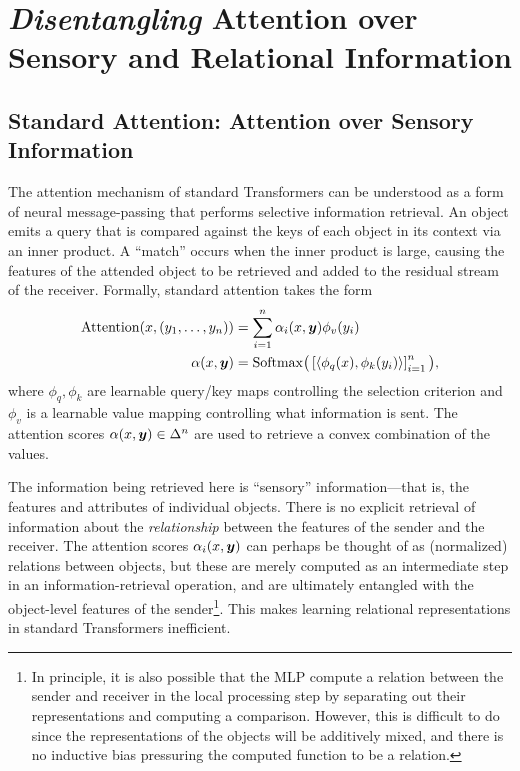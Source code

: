\section{\textit{Disentangling} Attention over Sensory and Relational Information}

\subsection{Standard Attention: Attention over Sensory Information}

The attention mechanism of standard Transformers can be understood as a form of neural message-passing that performs selective information retrieval. An object emits a query that is compared against the keys of each object in its context via an inner product. A ``match'' occurs when the inner product is large, causing the features of the attended object to be retrieved and added to the residual stream of the receiver. Formally, standard attention takes the form
\begin{equation}\label{eq:self_attn}
  \begin{split}
    \mathrm{Attention}(x, (y_1, \ldots, y_n)) &= \sum_{i=1}^{n} \alpha_i(x, \bm{y}) \phi_v(y_i) \\
    \alpha(x, \bm{y}) &= \mathrm{Softmax}\big(\left[\left \langle \phi_q(x), \phi_k(y_i) \right\rangle\right]_{i=1}^{n}\big),
  \end{split}
\end{equation}
where $\phi_q,\phi_k$ are learnable query/key maps controlling the selection criterion and $\phi_v$ is a learnable value mapping controlling what information is sent. The attention scores $\alpha(x, \bm{y}) \in \Delta^n$ are used to retrieve a convex combination of the values.

The information being retrieved here is ``sensory'' information---that is, the features and attributes of individual objects. There is no explicit retrieval of information about the \textit{relationship} between the features of the sender and the receiver. The attention scores $\alpha_i(x, \bm{y})$ can perhaps be thought of as (normalized) relations between objects, but these are merely computed as an intermediate step in an information-retrieval operation, and are ultimately entangled with the object-level features of the sender\footnote{In principle, it is also possible that the MLP compute a relation between the sender and receiver in the local processing step by separating out their representations and computing a comparison. However, this is difficult to do since the representations of the objects will be additively mixed, and there is no inductive bias pressuring the computed function to be a relation.}. This makes learning relational representations in standard Transformers inefficient.

